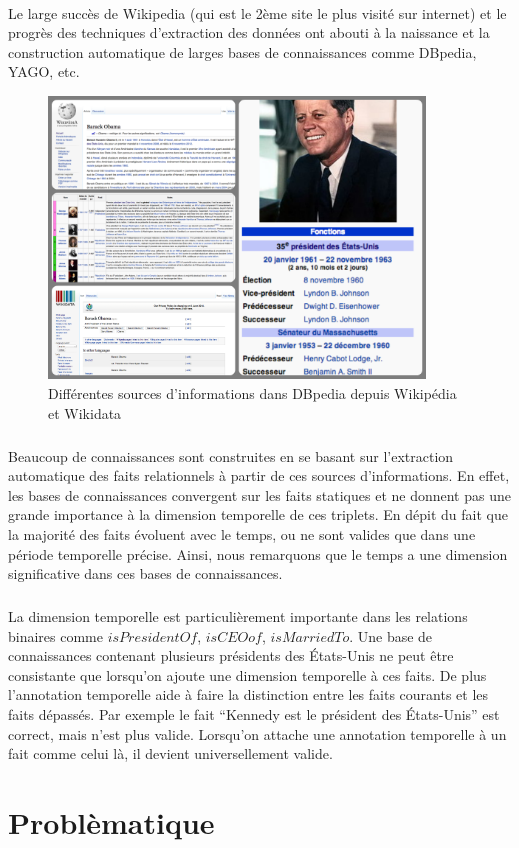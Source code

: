 \paragraph{}
Le large succès de Wikipedia (qui est le 2ème site le plus visité sur internet) et le progrès des techniques d’extraction des données ont abouti à la naissance et la construction automatique  de larges bases de connaissances comme DBpedia, YAGO, etc.
\begin{figure}[H]
\centering
\includegraphics[width=10cm]{Sources.png}
\caption{Différentes sources d'informations dans DBpedia depuis Wikipédia et Wikidata}
\end{figure}
\subparagraph{}
Beaucoup de connaissances sont construites en se basant sur l’extraction automatique des faits relationnels à partir de ces sources d'informations.
En effet, les bases de connaissances convergent sur les faits statiques et ne donnent pas une grande importance à la dimension temporelle de ces triplets.
En dépit du fait que la majorité des faits évoluent avec le temps, ou ne sont valides que dans une période temporelle précise. Ainsi, nous remarquons que le temps a une dimension significative dans ces bases de connaissances.
\subparagraph{}
La dimension temporelle est particulièrement importante dans les relations binaires comme $isPresidentOf$, $isCEOof$, $isMarriedTo$. Une base de connaissances contenant plusieurs présidents des États-Unis ne peut être consistante que lorsqu’on ajoute une dimension temporelle à ces faits. De plus l’annotation temporelle aide à faire la distinction entre les faits courants et les faits dépassés.
Par exemple le fait ``Kennedy est le président des États-Unis'' est correct, mais n'est plus valide.
Lorsqu’on attache une annotation temporelle à un fait comme celui là, il devient universellement valide.

\section{Problèmatique}
